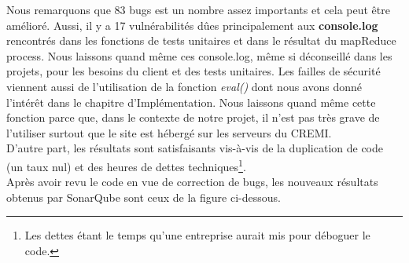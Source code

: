 Nous remarquons que 83 bugs est un nombre assez importants et cela peut être amélioré. Aussi, il y a 17 vulnérabilités dûes principalement aux {\bf console.log} rencontrés dans les fonctions de tests unitaires et dans le résultat du mapReduce process. Nous laissons quand même ces console.log, même si déconseillé dans les projets, pour les besoins du client et des tests unitaires. Les failles de sécurité viennent aussi de l'utilisation de la fonction \emph{eval()} dont nous avons donné l'intérêt dans le chapitre d'Implémentation. Nous laissons quand même cette fonction parce que, dans le contexte de notre projet, il n'est pas très grave de l'utiliser surtout que le site est hébergé sur les serveurs du CREMI. \\
D'autre part, les résultats sont satisfaisants vis-à-vis de la duplication de code (un taux nul) et des heures de dettes techniques\footnote{Les dettes étant le temps qu'une entreprise aurait mis pour déboguer le code.}.\\

Après avoir revu le code en vue de correction de bugs, les nouveaux résultats obtenus par SonarQube sont ceux de la figure ci-dessous.


